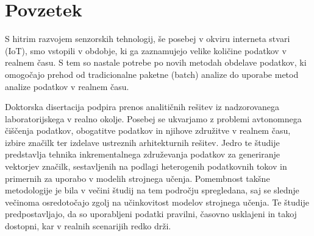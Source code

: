 % 
\chapter*{Povzetek}

S hitrim razvojem senzorskih tehnologij, še posebej v okviru interneta stvari (IoT), smo vstopili v obdobje, ki ga zaznamujejo velike količine podatkov v realnem času. 
S tem so nastale potrebe po novih metodah obdelave podatkov, ki omogočajo prehod od tradicionalne paketne (batch) analize do uporabe metod analize podatkov v realnem času.

Doktorska disertacija podpira prenos analitičnih rešitev iz nadzorovanega laboratorijskega v realno okolje. 
Posebej se ukvarjamo z problemi avtonomnega čiščenja podatkov, obogatitve podatkov in njihove združitve v realnem času, izbire značilk ter izdelave ustreznih arhitekturnih rešitev.
Jedro te študije predstavlja tehnika inkrementalnega združevanja podatkov za generiranje vektorjev značilk, sestavljenih na podlagi heterogenih podatkovnih tokov in primernih za uporabo v modelih strojnega učenja.
Pomembnost takšne metodologije je bila v večini študij na tem področju spregledana, saj se slednje večinoma osredotočajo zgolj na učinkovitost modelov strojnega učenja.
Te študije predpostavljajo, da so uporabljeni podatki pravilni, časovno usklajeni in takoj dostopni, kar v realnih scenarijih redko drži.

